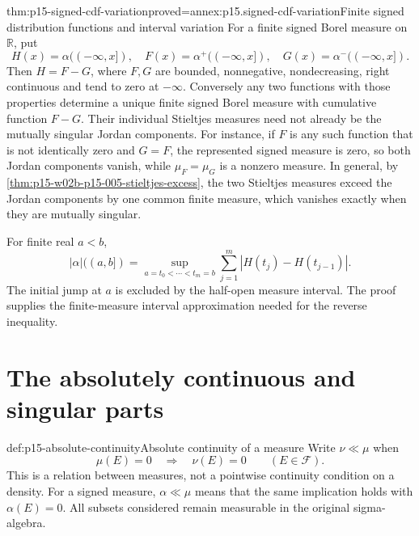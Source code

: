 \begin{hbtheorem}{thm:p15-signed-cdf-variation}{proved=annex:p15.signed-cdf-variation}{Finite signed distribution functions and interval variation}
For a finite signed Borel measure on \(\mathbb R\), put
\[
 H(x)=\alpha((-\infty,x]),\quad
 F(x)=\alpha^+((-\infty,x]),\quad
 G(x)=\alpha^-((-\infty,x]).
\]
Then \(H=F-G\), where \(F,G\) are bounded, nonnegative, nondecreasing,
right continuous and tend to zero at \(-\infty\).
Conversely any two functions with those properties determine a unique
finite signed Borel measure with cumulative function \(F-G\).
Their individual Stieltjes measures need not already be the mutually
singular Jordan components. For instance, if \(F\) is any such function
that is not identically zero and \(G=F\), the represented signed measure
is zero, so both Jordan components vanish, while \(\mu_F=\mu_G\) is a
nonzero measure. In general, by \cref{thm:p15-w02b-p15-005-stieltjes-excess},
the two Stieltjes measures exceed the Jordan components by one common
finite measure, which vanishes exactly when they are mutually singular.

For finite real \(a<b\),
\[
 \lvert\alpha\rvert((a,b])
  =\sup_{a=t_0<\cdots<t_m=b}
       \sum_{j=1}^m|H(t_j)-H(t_{j-1})|.
\]
The initial jump at \(a\) is excluded by the half-open measure interval.
The proof supplies the finite-measure interval approximation needed
for the reverse inequality.
\end{hbtheorem}

\section{The absolutely continuous and singular parts}
\label{sec:p15-lebesgue-decomposition}

\begin{hbdefinition}{def:p15-absolute-continuity}{Absolute continuity of a measure}
Write \(\nu\ll\mu\) when
\[
                     \mu(E)=0\quad\Longrightarrow\quad\nu(E)=0
                              \qquad(E\in\mathcal F).
\]
This is a relation between measures, not a pointwise continuity
condition on a density. For a signed measure, \(\alpha\ll\mu\) means
that the same implication holds with \(\alpha(E)=0\).
All subsets considered remain measurable in the original sigma-algebra.
\end{hbdefinition}

